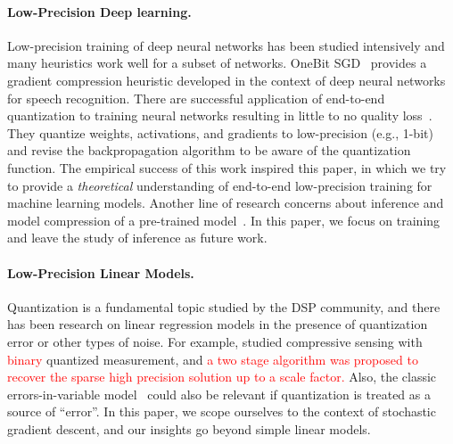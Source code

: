 \documentclass{article}
\begin{document}
\vspace{-1em}
\paragraph{Low-Precision Deep learning.}

Low-precision training of deep neural networks has been studied
intensively and many heuristics work well for a subset of networks.
OneBit SGD~\cite{Frank:2014:Interspeech} provides
a gradient compression heuristic developed in the context of deep 
neural networks for speech recognition. There are successful 
application of end-to-end quantization to training neural networks
resulting in little to no quality loss~\cite{hubara2016quantized,
rastegari2016xnor,zhou2016dorefa,miyashita2016convolutional,li2016ternary,gupta2015deep}. They  quantize weights, activations, and gradients 
to low-precision (e.g., 1-bit) and revise the backpropagation 
algorithm to be aware of the quantization function.
The empirical success of this work inspired this paper, in which we try
to provide a {\em theoretical} understanding of end-to-end low-precision
training for machine learning models.
Another line of research concerns about inference and model
compression of a pre-trained model~\cite{vanhoucke2011improving,gong2014compressing,Han:2016:ICLR,lin2016fixed,kim2016bitwise,kim2015compression,wu2016quantized}.
In this paper, we focus on training and leave the study of
inference as future work.

\vspace{-1.2em}
\paragraph{Low-Precision Linear Models.}

Quantization is a fundamental topic studied by the
DSP community, and there has been research on
linear regression models in the presence of quantization
error or other types of noise. For example,
\citet{Gopi:2013:ICML} studied compressive sensing
with \textcolor{red}{binary} quantized measurement, and \textcolor{red}{a two stage algorithm was proposed to recover the sparse high precision solution up to a scale factor.}
Also, the
classic errors-in-variable model~\cite{Hall:2008:Book}
could also be relevant if quantization is treated 
as a source of ``error''. In this paper, we scope
ourselves to the context of stochastic gradient descent, 
and our insights go beyond simple linear models.
\end{document}
